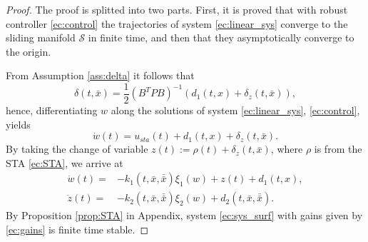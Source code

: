 \documentclass[onecolumn]{IEEEtran}
\newtheorem{proof}{Proof}
\begin{document}
\begin{proof}
The proof is splitted into two parts. First, it is proved  that with robust controller \eqref{ec:control} the trajectories of system \eqref{ec:linear_sys}  converge to the sliding manifold $\mathcal{S}$ in finite time, and then  that they asymptotically converge to the origin. 

 From  Assumption \ref{ass:delta} it follows that 
\begin{equation*}
\delta(t,\bar x)=\frac{1}{2}\left(B^TPB\right)^{-1}\left(d_1(t,x)+\delta_z(t,\bar x)\right),
\end{equation*}
hence, differentiating $w$ along the solutions of system \eqref{ec:linear_sys}, \eqref{ec:control},  yields
\begin{equation}
\label{ec:derivative_wsta}
\dot w(t)=u_{sta}(t)+d_1(t,x)+\delta_z(t,\bar x).
\end{equation}
By taking the change of variable $z(t):=\rho(t)+\delta_z(t,\bar x)$, where $\rho$ is from the STA \eqref{ec:STA}, we arrive at
\begin{equation}
\label{ec:sys_surf}
\begin{split}
\dot w(t)=&-k_1(t,\bar x,\bar {\bar x})\xi_1(w)+z(t)+d_1(t,x),\\
\dot z(t)=&-k_2(t,\bar x,\bar {\bar x})\xi_2(w)+d_2(t,\bar x,\bar {\bar{x}}).
\end{split}
\end{equation}
By Proposition \ref{prop:STA} in Appendix, system \eqref{ec:sys_surf} with gains given by \eqref{ec:gains}  is finite time stable.



\end{proof}
\end{document}
